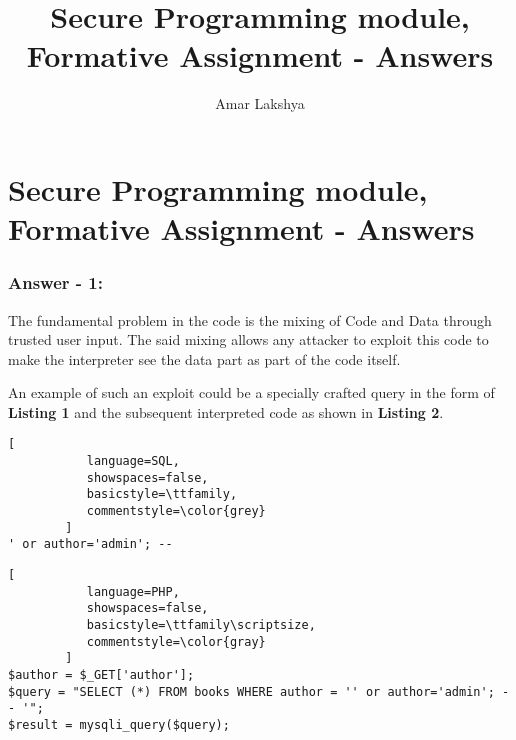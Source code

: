 \documentclass[10pt,a4paper,oneside]{article}
\author{Amar Lakshya}
\title{Secure Programming module, Formative Assignment - Answers}
\begin{document}
\part*{Secure Programming module, Formative Assignment - Answers}

\section*{Answer - 1:}


The fundamental problem in the code is the mixing of Code and Data through trusted user input. The said mixing allows any attacker to exploit this code to make the interpreter see the data part as part of the code itself.
\par
An example of such an exploit could be a specially crafted query in the form of \textbf{Listing 1} and the subsequent interpreted code as shown in \textbf{Listing 2}.


\begin{lstlisting}[
           language=SQL,
           showspaces=false,
           basicstyle=\ttfamily,
           commentstyle=\color{grey}
        ]
' or author='admin'; -- 
\end{lstlisting}


\lstset{keywordstyle=\bfseries}
\begin{lstlisting}[
           language=PHP,
           showspaces=false,
           basicstyle=\ttfamily\scriptsize,
           commentstyle=\color{gray}
        ]
$author = $_GET['author'];
$query = "SELECT (*) FROM books WHERE author = '' or author='admin'; -- '";
$result = mysqli_query($query);
\end{lstlisting}
\end{document}

